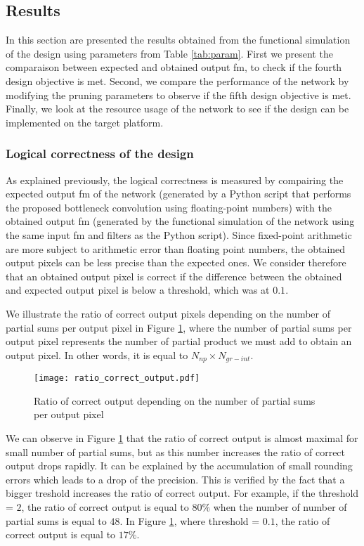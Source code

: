 \subsection{Results} \label{subs:res}
In this section are presented the results obtained from the functional simulation of the design using parameters from Table \ref{tab:param}. First we present the comparaison between expected and obtained output \acrshort{fm}, to check if the fourth design objective is met. Second, we compare the performance of the network by modifying the pruning parameters to observe if the fifth design objective is met. Finally, we look at the resource usage of the network to see if the design can be implemented on the target platform.
%
\subsubsection{Logical correctness of the design}
%
As explained previously, the logical correctness is measured by compairing the expected output \acrshort{fm} of the network (generated by a Python script that performs the proposed bottleneck convolution using floating-point numbers) with the obtained output \acrshort{fm} (generated by the functional simulation of the network using the same input \acrshort{fm} and filters as the Python script). Since fixed-point arithmetic are more subject to arithmetic error than floating point numbers, the obtained output pixels can be less precise than the expected ones. We consider therefore that an obtained output pixel is correct if the difference between the obtained and expected output pixel is below a threshold, which was at $0.1$.

We illustrate the ratio of correct output pixels depending on the number of partial sums per output pixel in Figure \ref{fig:res-output}, where the number of partial sums per output pixel represents the number of partial product we must add to obtain an output pixel. In other words, it is equal to $N_{np} \times N_{gr-int}$.
%
\begin{figure}[H]
    \centering
    \texttt{[image: ratio\_correct\_output.pdf]}
    \caption{Ratio of correct output depending on the number of partial sums per output pixel}
    \label{fig:res-output}
\end{figure}

We can observe in Figure \ref{fig:res-output} that the ratio of correct output is almost maximal for small number of partial sums, but as this number increases the ratio of correct output drops rapidly. It can be explained by the accumulation of small rounding errors which leads to a drop of the precision. This is verified by the fact that a bigger treshold increases the ratio of correct output. For example, if the threshold = $2$, the ratio of correct output is equal to $80\%$ when the number of number of partial sums is equal to $48$. In Figure \ref{fig:res-output}, where threshold = $0.1$, the ratio of correct output is equal to $17\%$.
%
